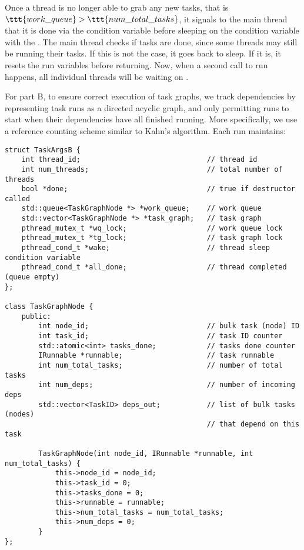 \documentclass[11pt]{article}
\begin{document}
\smallskip
Once a thread is no longer able to grab any new tasks, that is
$\ttt{work\_queue} > \ttt{num\_total\_tasks}$, it signals to the main thread
that it is done via the  condition variable before sleeping on
the  condition variable with the . The main thread
checks if  tasks are done, since some threads may still be running
their tasks. If this is not the case, it goes back to sleep. If it is, it resets
the run variables before returning. Now, when a second call to run happens, all
individual threads will be waiting on .

\bigskip
For part B, to ensure correct execution of task graphs, we track dependencies by
representing task runs as a directed acyclic graph, and only permitting runs to
start when their dependencies have all finished running. More specifically, we
use a reference counting scheme similar to Kahn's algorithm. Each run maintains: 

\begin{lstlisting}
struct TaskArgsB {
    int thread_id;                              // thread id
    int num_threads;                            // total number of threads
    bool *done;                                 // true if destructor called
    std::queue<TaskGraphNode *> *work_queue;    // work queue
    std::vector<TaskGraphNode *> *task_graph;   // task graph
    pthread_mutex_t *wq_lock;                   // work queue lock
    pthread_mutex_t *tg_lock;                   // task graph lock
    pthread_cond_t *wake;                       // thread sleep condition variable
    pthread_cond_t *all_done;                   // thread completed (queue empty)
};

class TaskGraphNode {
    public:
        int node_id;                            // bulk task (node) ID
        int task_id;                            // task ID counter
        std::atomic<int> tasks_done;            // tasks done counter
        IRunnable *runnable;                    // task runnable
        int num_total_tasks;                    // number of total tasks
        int num_deps;                           // number of incoming deps
        std::vector<TaskID> deps_out;           // list of bulk tasks (nodes)
                                                // that depend on this task

        TaskGraphNode(int node_id, IRunnable *runnable, int num_total_tasks) {
            this->node_id = node_id;
            this->task_id = 0;
            this->tasks_done = 0;
            this->runnable = runnable;
            this->num_total_tasks = num_total_tasks;
            this->num_deps = 0;
        }
};
\end{lstlisting}
\end{document}
